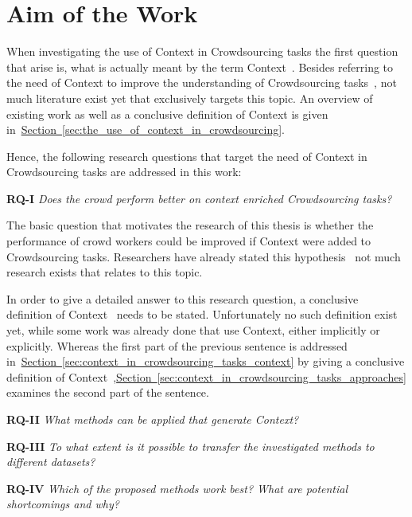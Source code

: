 \section{Aim of the Work}
When investigating the use of Context in Crowdsourcing tasks the first question that arise is, what is actually
meant by the term \guillemotright Context\guillemotleft~. Besides referring to the need of Context to improve the understanding
of Crowdsourcing tasks~\cite{sarasua2015crowdsourcing}, not much literature exist yet that exclusively targets this topic. An overview
of existing work as well as a conclusive definition of Context is given in~\hyperref[sec:the_use_of_context_in_crowdsourcing]{Section~\ref*{sec:the_use_of_context_in_crowdsourcing}}.

Hence, the following research questions that target the need of Context in Crowdsourcing tasks are addressed in this work:

\textbf{RQ-I} \emph{Does the crowd perform better on context enriched Crowdsourcing tasks?}

The basic question that motivates the research of this thesis is whether the performance of crowd workers could be improved if Context were added
to Crowdsourcing tasks. Researchers have already stated this hypothesis~\cite{sarasua2015crowdsourcing} not much research exists that relates to this topic. 

In order to give a detailed answer to this research question, a conclusive definition of \guillemotright Context\guillemotleft~ needs to be stated. Unfortunately no such definition exist yet, while some work was already done that use Context, either implicitly or explicitly. Whereas the first part of the previous sentence is addressed in~\hyperref[sec:context_in_crowdsourcing_tasks_context]{Section~\ref*{sec:context_in_crowdsourcing_tasks_context}} by giving a conclusive definition of \guillemotright Context\guillemotleft~,\hyperref[sec:context_in_crowdsourcing_tasks_approaches]{Section~\ref*{sec:context_in_crowdsourcing_tasks_approaches}} examines the second part of the sentence. 



\textbf{RQ-II} \emph{What methods can be applied that generate Context?}

 
\textbf{RQ-III} \emph{To what extent is it possible to transfer the investigated methods to different datasets?}


\textbf{RQ-IV} \emph{Which of the proposed methods work best? What are potential shortcomings and why?}


